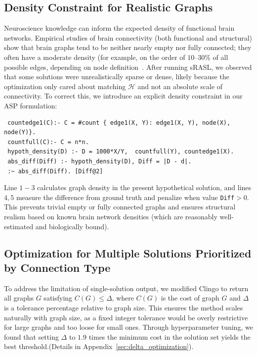 \subsection{Density Constraint for Realistic Graphs}

Neuroscience knowledge can inform the expected density of functional brain networks. Empirical studies of brain connectivity (both functional and structural) show that brain graphs tend to be neither nearly empty nor fully connected; they often have a moderate density (for example, on the order of $10–30\%$ of all possible edges, depending on node definition~\citep{smith2011network, morgan2018low, argiris2025brain}. After running sRASL, we observed that some solutions were unrealistically sparse or dense, likely because the optimization only cared about matching $\mathcal{H}$ and not an absolute scale of connectivity. To correct this, we introduce an explicit density constraint in our ASP formulation:

\begin{lstlisting}
 countedge1(C):- C = #count { edge1(X, Y): edge1(X, Y), node(X), node(Y)}.
 countfull(C):- C = n*n. 
 hypoth_density(D) :- D = 1000*X/Y,  countfull(Y), countedge1(X). 
 abs_diff(Diff) :- hypoth_density(D), Diff = |D - d|.
 :~ abs_diff(Diff). [Diff@2]
\end{lstlisting}

Line $1-3$ calculates graph density in the present hypothetical solution, and lines $4,5$ measure the difference from ground truth and penalize when value \texttt{Diff}$ > 0$. This prevents trivial empty or fully connected graphs and ensures structural realism based on known brain network densities (which are reasonably well-estimated and biologically bound).

\subsection{Optimization for Multiple Solutions Prioritized by Connection Type}
\label{sec:optim_for_multi_sols}



To address the limitation of single-solution output, we modified Clingo to return all graphs $G$ satisfying $C(G) \leq  \Delta$, where $C(G)$ is the cost of graph $G$ and $\Delta$ is a tolerance percentage relative to graph size. This ensures the method scales naturally with graph size, as a fixed integer tolerance would be overly restrictive for large graphs and too loose for small ones. Through hyperparameter tuning, we found that setting $\Delta$ to $1.9$ times the minimum cost in the solution set yields the best threshold.(Details in Appendix~\ref{sec:delta_optimization}). 


